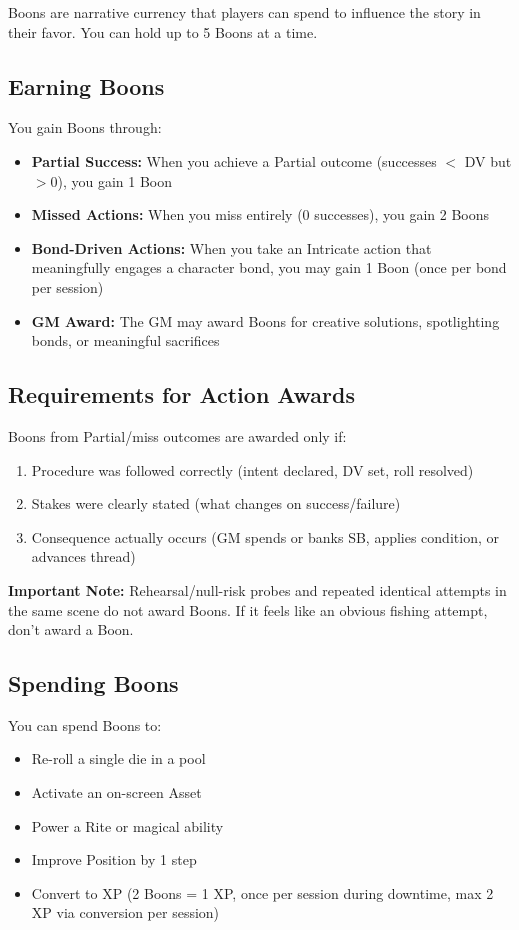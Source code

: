 \documentclass[11pt,twoside,openany]{book}
\begin{document}
Boons are narrative currency that players can spend to influence the story in their favor. You can hold up to 5 Boons at a time.

\subsection*{Earning Boons}

You gain Boons through:
\begin{itemize}
\item \textbf{Partial Success:} When you achieve a Partial outcome (successes $<$ DV but $> 0$), you gain 1 Boon
\item \textbf{Missed Actions:} When you miss entirely (0 successes), you gain 2 Boons
\item \textbf{Bond-Driven Actions:} When you take an Intricate action that meaningfully engages a character bond, you may gain 1 Boon (once per bond per session)
\item \textbf{GM Award:} The GM may award Boons for creative solutions, spotlighting bonds, or meaningful sacrifices
\end{itemize}

\subsection*{Requirements for Action Awards}

Boons from Partial/miss outcomes are awarded only if:
\begin{enumerate}
\item Procedure was followed correctly (intent declared, DV set, roll resolved)
\item Stakes were clearly stated (what changes on success/failure)
\item Consequence actually occurs (GM spends or banks SB, applies condition, or advances thread)
\end{enumerate}

\textbf{Important Note:} Rehearsal/null-risk probes and repeated identical attempts in the same scene do not award Boons. If it feels like an obvious fishing attempt, don't award a Boon.

\subsection*{Spending Boons}

You can spend Boons to:
\begin{itemize}
\item Re-roll a single die in a pool
\item Activate an on-screen Asset
\item Power a Rite or magical ability
\item Improve Position by 1 step
\item Convert to XP (2 Boons = 1 XP, once per session during downtime, max 2 XP via conversion per session)
\end{itemize}
\end{document}
